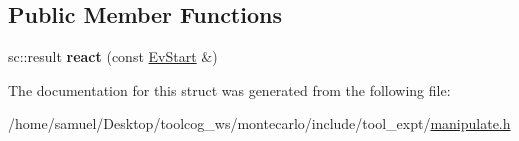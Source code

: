 \subsection*{Public Member Functions}
\begin{DoxyCompactItemize}
\item 
\mbox{\label{structReadyState_ab1c600b92f8955dc92cdda4472589e2c}} 
sc\+::result {\bfseries react} (const \hyperlink{structEvStart}{Ev\+Start} \&)
\end{DoxyCompactItemize}


The documentation for this struct was generated from the following file\+:\begin{DoxyCompactItemize}
\item 
/home/samuel/\+Desktop/toolcog\+\_\+ws/montecarlo/include/tool\+\_\+expt/\hyperlink{manipulate_8h}{manipulate.\+h}\end{DoxyCompactItemize}
